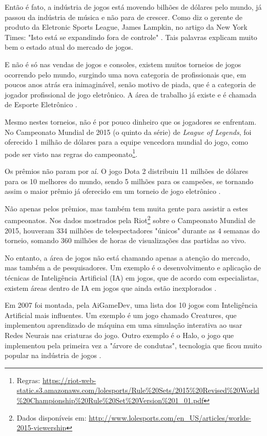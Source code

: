 \documentclass[
	12pt,					%
	openright,				%
	oneside,				%
	a4paper,				%
	bibjustif,				%
	chapter=TITLE,			%
	english,				%
	brazil,					%
	]{abntex2}
\begin{document}
	Então é fato, a indústria de jogos está movendo bilhões de dólares pelo mundo,
	já passou da indústria de música e não para de crescer.
	Como diz o gerente de produto da Eletronic Sports League, James Lampkin,
	no artigo da New York Times:
	"Isto está se expandindo fora de controle"{}
	\cite[tradução nossa]{nytimes}.
	Tais palavras explicam muito bem o estado atual do mercado de jogos.
	
	E não é só nas vendas de jogos e consoles,
	existem muitos torneios de jogos ocorrendo pelo mundo,
	surgindo uma nova categoria de profissionais que,
	em poucos anos atrás era inimaginável, senão motivo de piada,
	que é a categoria de jogador profissional de jogo eletrônico.
	A área de trabalho já existe e é chamada de Esporte Eletrônico \cite{nytimes}.
	
	Mesmo nestes torneios, não é por pouco dinheiro que os jogadores se enfrentam.
	No Campeonato Mundial de 2015 (o quinto da série) de \textit{League of Legends},
	foi oferecido 1 milhão de dólares para a equipe vencedora mundial do jogo,
	como pode ser visto nas regras do campeonato\footnote{Regras: \url{https://riot-web-static.s3.amazonaws.com/lolesports/Rule\%20Sets/2015\%20Revised\%20World\%20Championship\%20Rule\%20Set\%20Version\%201\_01.pdf}}.
	
	Os prêmios não param por aí.
	O jogo Dota 2 distribuiu 11 milhões de dólares para os 10 melhores do mundo,
	sendo 5 milhões para os campeões,
	se tornando assim o maior prêmio já oferecido em um torneio de jogo eletrônico \cite{nytimes}.
	
	Não apenas pelos prêmios, mas também tem muita gente para assistir a estes campeonatos.
	Nos dados mostrados pela Riot\footnote{Dados disponíveis em: \url{http://www.lolesports.com/en_US/articles/worlds-2015-viewership}}
	sobre o Campeonato Mundial de 2015,
	houveram 334 milhões de telespectadores "únicos"{} durante as 4 semanas do torneio,
	somando 360 milhões de horas de visualizações das partidas ao vivo.
	
	No entanto, a área de jogos não está chamando apenas a atenção do mercado,
	mas também a de pesquisadores.
	Um exemplo é o desenvolvimento e aplicação de técnicas de Inteligência Artificial (IA) em jogos,
	que de acordo com especialistas,
	existem áreas dentro de IA em jogos que ainda estão inexplorados \cite{panoramaAI}.
	
	Em 2007 foi montada, pela AiGameDev, uma lista dos 10 jogos com Inteligência Artificial mais influentes.
	Um exemplo é um jogo chamado Creatures,
	que implementou aprendizado de máquina em uma simulação interativa
	ao usar Redes Neurais nas criaturas do jogo.
	Outro exemplo é o Halo,
	o jogo que implementou pela primeira vez a "árvore de condutas"{},
	tecnologia que ficou muito popular na indústria de jogos \cite{aigamedev}.
	
\end{document}
